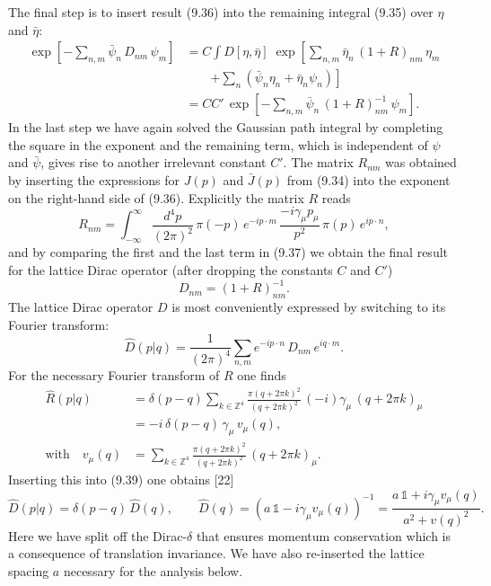 The final step is to insert result (9.36) into the remaining integral (9.35)
over $\eta$ and $\bar\eta$:
\begin{align}
  \exp\!\left[-\sum_{n,m}\bar\psi_n\,D_{nm}\,\psi_m\right]
  &= C\int D[\eta,\bar\eta]\;
     \exp\!\left[\sum_{n,m}\bar\eta_n\,(1+R)_{nm}\,\eta_m\right. \nonumber\\
  &\qquad \left.+ \sum_n\left(\bar\psi_n\eta_n + \bar\eta_n\psi_n\right)\right] \nonumber\\
  &= CC'\,\exp\!\left[-\sum_{n,m}\bar\psi_n\,(1+R)^{-1}_{nm}\,\psi_m\right] .
\end{align}
In the last step we have again solved the Gaussian path integral by completing
the square in the exponent and the remaining term, which is independent of
$\psi$ and $\bar\psi$, gives rise to another irrelevant constant $C'$. The
matrix $R_{nm}$ was obtained by inserting the expressions for $J(p)$ and
$\bar J(p)$ from (9.34) into the exponent on the right-hand side of (9.36).
Explicitly the matrix $R$ reads
\begin{equation}
  R_{nm} = \int_{-\infty}^{\infty}\frac{d^4p}{(2\pi)^2}\,
    \pi(-p)\,e^{-ip\cdot m}\,\frac{-i\gamma_\mu p_\mu}{p^2}\,\pi(p)\,e^{ip\cdot n} ,
\end{equation}
and by comparing the first and the last term in (9.37) we obtain the final
result for the lattice Dirac operator (after dropping the constants $C$ and
$C'$)
\begin{equation}
  D_{nm} = (1+R)^{-1}_{nm} .
\end{equation}
The lattice Dirac operator $D$ is most conveniently expressed by switching to
its Fourier transform:
\begin{equation}
  \hat D(p|q) = \frac{1}{(2\pi)^4}\sum_{n,m}e^{-ip\cdot n}\,D_{nm}\,e^{iq\cdot m} .
\end{equation}
For the necessary Fourier transform of $R$ one finds
\begin{align}
  \hat R(p|q)
  &= \delta(p-q)\sum_{k\in\mathbb{Z}^4}
     \frac{\pi(q+2\pi k)^2}{(q+2\pi k)^2}\,(-i)\gamma_\mu\,(q+2\pi k)_\mu \nonumber\\
  &= -i\,\delta(p-q)\,\gamma_\mu\,v_\mu(q) , \nonumber\\
  \text{with}\quad v_\mu(q)
  &= \sum_{k\in\mathbb{Z}^4}
     \frac{\pi(q+2\pi k)^2}{(q+2\pi k)^2}\,(q+2\pi k)_\mu .
\end{align}
Inserting this into (9.39) one obtains [22]
\begin{equation}
  \hat D(p|q) = \delta(p-q)\,\hat D(q) , \qquad
  \hat D(q) = \left(a\,\mathbb{1} - i\gamma_\mu v_\mu(q)\right)^{-1}
    = \frac{a\,\mathbb{1} + i\gamma_\mu v_\mu(q)}{a^2 + v(q)^2} .
\end{equation}
Here we have split off the Dirac-$\delta$ that ensures momentum conservation
which is a consequence of translation invariance. We have also re-inserted the
lattice spacing $a$ necessary for the analysis below.

